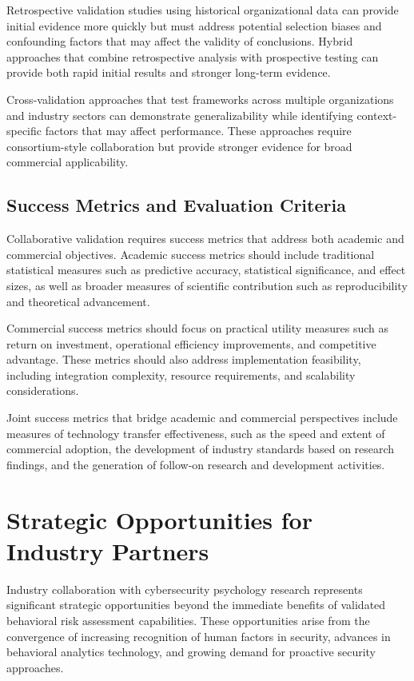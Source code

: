\documentclass[10pt,twocolumn]{IEEEtran}
\begin{document}
Retrospective validation studies using historical organizational data can provide initial evidence more quickly but must address potential selection biases and confounding factors that may affect the validity of conclusions. Hybrid approaches that combine retrospective analysis with prospective testing can provide both rapid initial results and stronger long-term evidence.

Cross-validation approaches that test frameworks across multiple organizations and industry sectors can demonstrate generalizability while identifying context-specific factors that may affect performance. These approaches require consortium-style collaboration but provide stronger evidence for broad commercial applicability.

\subsection{Success Metrics and Evaluation Criteria}

Collaborative validation requires success metrics that address both academic and commercial objectives. Academic success metrics should include traditional statistical measures such as predictive accuracy, statistical significance, and effect sizes, as well as broader measures of scientific contribution such as reproducibility and theoretical advancement.

Commercial success metrics should focus on practical utility measures such as return on investment, operational efficiency improvements, and competitive advantage. These metrics should also address implementation feasibility, including integration complexity, resource requirements, and scalability considerations.

Joint success metrics that bridge academic and commercial perspectives include measures of technology transfer effectiveness, such as the speed and extent of commercial adoption, the development of industry standards based on research findings, and the generation of follow-on research and development activities.

\section{Strategic Opportunities for Industry Partners}

Industry collaboration with cybersecurity psychology research represents significant strategic opportunities beyond the immediate benefits of validated behavioral risk assessment capabilities. These opportunities arise from the convergence of increasing recognition of human factors in security, advances in behavioral analytics technology, and growing demand for proactive security approaches.
\end{document}
